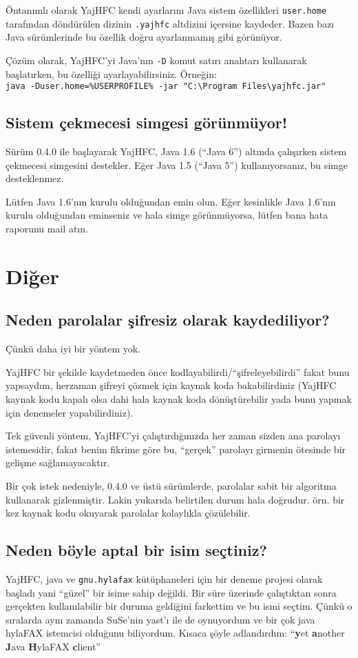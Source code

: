 \documentclass[a4paper,10pt]{scrartcl}
\begin{document}
Öntanımlı olarak YajHFC kendi ayarlarını Java sistem özellikleri \texttt{user.home} tarafından döndürülen dizinin 
\texttt{.yajhfc} altdizini içersine kaydeder.
Bazen bazı Java sürümlerinde bu özellik doğru ayarlanmamış gibi görünüyor.

Çözüm olarak, YajHFC'yi Java'nın \texttt{-D} komut satırı anahtarı kullanarak başlatırken, bu özelliği ayarlayabilirsiniz. Örneğin: \\
\texttt{java -Duser.home=\%USERPROFILE\% -jar "C:\textbackslash Program Files\textbackslash yajhfc.jar"}

\subsection{Sistem çekmecesi simgesi görünmüyor!}

Sürüm 0.4.0 ile başlayarak YajHFC, Java 1.6 (``Java 6'') altında çalışırken sistem çekmecesi simgesini destekler. Eğer Java 1.5 (``Java 5'') kullanıyorsanız, bu simge desteklenmez.

Lütfen Java 1.6'nın kurulu olduğundan emin olun. Eğer kesinlikle Java 1.6'nın kurulu olduğundan eminseniz ve hala simge görünmüyorsa, lütfen bana hata raporunu mail atın.

\section{Diğer}

\subsection{Neden parolalar şifresiz olarak kaydediliyor?}

Çünkü daha iyi bir yöntem yok.

YajHFC bir şekilde kaydetmeden önce kodlayabilirdi/``şifreleyebilirdi'' fakat
bunu yapsaydım, herzaman şifreyi çözmek için kaynak koda bakabilirdiniz 
(YajHFC kaynak kodu kapalı olsa dahi hala kaynak koda dönüştürebilir 
yada bunu yapmak için denemeler yapabilirdiniz).

Tek güvenli yöntem, YajHFC'yi çalıştırdığınızda her zaman sizden ana parolayı 
istemesidir, fakat benim fikrime göre bu, ``gerçek'' parolayı girmenin ötesinde
bir gelişme sağlamayacaktır.

Bir çok istek nedeniyle, 0.4.0 ve üstü sürümlerde, parolalar sabit bir algoritma kullanarak gizlenmiştir.
Lakin yukarıda belirtilen durum hala doğrudur. örn. bir kez kaynak kodu okuyarak parolalar kolaylıkla çözülebilir.

\subsection{Neden böyle aptal bir isim seçtiniz?}

YajHFC, java ve \texttt{gnu.hylafax} kütüphaneleri için bir deneme projesi olarak başladı
yani ``güzel'' bir isime sahip değildi. Bir süre üzerinde çalıştıktan sonra 
gerçekten kullanılabilir bir duruma geldiğini farkettim ve bu ismi seçtim. 
Çünkü o sıralarda aynı zamanda SuSe'nin yast'ı ile de oynuyordum ve bir çok java hylaFAX istemcisi 
olduğunu biliyordum. Kısaca şöyle adlandırdım:
``\textbf{y}et \textbf{a}nother \textbf{J}ava \textbf{H}ylaFAX \textbf{c}lient''
\end{document}
